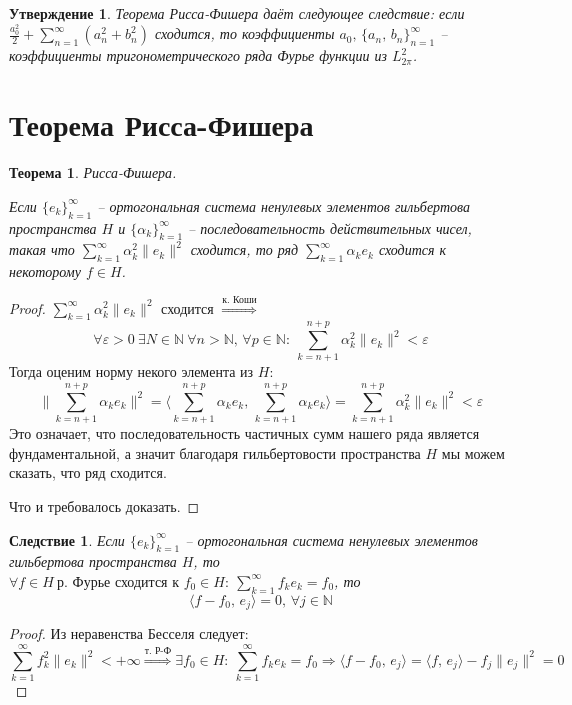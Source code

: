 \documentclass[a4paper,12pt]{article}
\theoremstyle{plain}
\newtheorem{theorem}{Теорема}[section]
\newtheorem{proposition}{Утверждение}[section]
\newtheorem*{corollary}{Следствие}
\theoremstyle{definition}
\theoremstyle{remark}
\begin{document}
\begin{proposition}
	Теорема Рисса-Фишера даёт следующее следствие: если $\frac{a_0^2}{2} + \sum_{n = 1}^\infty (a_n^2 + b_n^2)$ сходится, то коэффициенты $a_0,\, \{a_n,\,b_n\}_{n = 1}^\infty$ -- коэффициенты тригонометрического ряда Фурье функции из $L_{2\pi}^2$.
\end{proposition}

\section{Теорема Рисса-Фишера}
\begin{theorem}
	Рисса-Фишера.

	Если $\{e_k\}_{k = 1}^\infty$ -- ортогональная система ненулевых элементов гильбертова пространства $H$ и $\{\alpha_k\}_{k = 1}^\infty$ -- последовательность действительных чисел, такая что $\sum_{k = 1}^\infty \alpha_k^2 \|e_k\|^2$ сходится, то ряд $\sum_{k = 1}^\infty \alpha_ke_k$ сходится к некоторому $f \in H$.
\end{theorem}

\begin{proof}
	$\sum_{k = 1}^\infty \alpha_k^2\|e_k\|^2$ сходится $\stackrel{\text{к. Коши}}{\Rightarrow}$
	\[\forall \varepsilon > 0 \: \exists N \in \mathbb{N} \: \forall n > \mathbb{N},\, \forall p \in \mathbb{N}:\: \sum_{k = n + 1}^{n + p} \alpha_k^2\|e_k\|^2 < \varepsilon\]
	Тогда оценим норму некого элемента из $H$:
	\[\|\sum_{k = n + 1}^{n + p}\alpha_ke_k\|^2 = \langle\sum_{k = n + 1}^{n + p}\alpha_ke_k,\, \sum_{k = n + 1}^{n + p}\alpha_ke_k\rangle = \sum_{k = n + 1}^{n + p}\alpha_k^2\|e_k\|^2 < \varepsilon\]
	Это означает, что последовательность частичных сумм нашего ряда является фундаментальной, а значит благодаря гильбертовости пространства $H$ мы можем сказать, что ряд сходится.

	Что и требовалось доказать.
\end{proof}

\begin{corollary}
	Если $\{e_k\}_{k = 1}^\infty$ -- ортогональная система ненулевых элементов гильбертова пространства $H$, то $\forall f \in H\: \text{р. Фурье сходится к }f_0 \in H:\: \sum_{k = 1}^\infty f_ke_k = f_0$, то
	\[\langle f - f_0,\, e_j\rangle = 0,\, \forall j \in \mathbb{N}\]
\end{corollary}

\begin{proof}
	Из неравенства Бесселя следует:
	\[\sum_{k = 1}^\infty f_k^2\|e_k\|^2 < +\infty \stackrel{\text{т. Р-Ф}}{\Rightarrow} \exists f_0 \in H :\: \sum_{k = 1}^\infty f_ke_k = f_0 \Rightarrow \langle f - f_0,\,e_j\rangle = \langle f,\,e_j\rangle - f_j\|e_j\|^2 = 0\]
\end{proof}
\end{document}
